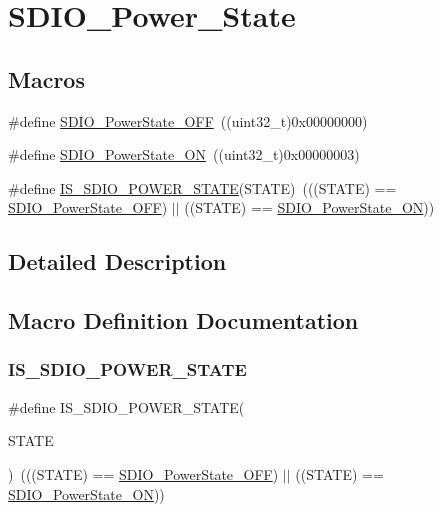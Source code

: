 \hypertarget{group___s_d_i_o___power___state}{}\section{S\+D\+I\+O\+\_\+\+Power\+\_\+\+State}
\label{group___s_d_i_o___power___state}
\subsection*{Macros}
\begin{DoxyCompactItemize}
\item 
\#define \mbox{\hyperlink{group___s_d_i_o___power___state_gab2f36a68fc50795ea74a7e98b4ac2d37}{S\+D\+I\+O\+\_\+\+Power\+State\+\_\+\+O\+FF}}~((uint32\+\_\+t)0x00000000)
\item 
\#define \mbox{\hyperlink{group___s_d_i_o___power___state_ga0aacd8c94effe8066c6d447fc884d217}{S\+D\+I\+O\+\_\+\+Power\+State\+\_\+\+ON}}~((uint32\+\_\+t)0x00000003)
\item 
\#define \mbox{\hyperlink{group___s_d_i_o___power___state_gad0dae767c2024de1769efb1feccc14ef}{I\+S\+\_\+\+S\+D\+I\+O\+\_\+\+P\+O\+W\+E\+R\+\_\+\+S\+T\+A\+TE}}(S\+T\+A\+TE)~(((S\+T\+A\+TE) == \mbox{\hyperlink{group___s_d_i_o___power___state_gab2f36a68fc50795ea74a7e98b4ac2d37}{S\+D\+I\+O\+\_\+\+Power\+State\+\_\+\+O\+FF}}) $\vert$$\vert$ ((S\+T\+A\+TE) == \mbox{\hyperlink{group___s_d_i_o___power___state_ga0aacd8c94effe8066c6d447fc884d217}{S\+D\+I\+O\+\_\+\+Power\+State\+\_\+\+ON}}))
\end{DoxyCompactItemize}


\subsection{Detailed Description}


\subsection{Macro Definition Documentation}
\mbox{\label{group___s_d_i_o___power___state_gad0dae767c2024de1769efb1feccc14ef}} 
\subsubsection{\texorpdfstring{IS\_SDIO\_POWER\_STATE}{IS\_SDIO\_POWER\_STATE}}
{\footnotesize\ttfamily \#define I\+S\+\_\+\+S\+D\+I\+O\+\_\+\+P\+O\+W\+E\+R\+\_\+\+S\+T\+A\+TE(\begin{DoxyParamCaption}\item[{}]{S\+T\+A\+TE }\end{DoxyParamCaption})~(((S\+T\+A\+TE) == \mbox{\hyperlink{group___s_d_i_o___power___state_gab2f36a68fc50795ea74a7e98b4ac2d37}{S\+D\+I\+O\+\_\+\+Power\+State\+\_\+\+O\+FF}}) $\vert$$\vert$ ((S\+T\+A\+TE) == \mbox{\hyperlink{group___s_d_i_o___power___state_ga0aacd8c94effe8066c6d447fc884d217}{S\+D\+I\+O\+\_\+\+Power\+State\+\_\+\+ON}}))}

